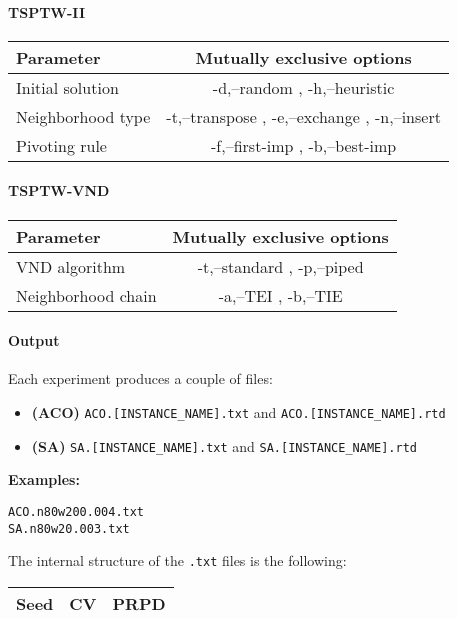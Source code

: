 \documentclass{article}
\begin{document}
\paragraph{TSPTW-II}
\begin{tabular}{|l|c|}
\hline
\textbf{Parameter}	&	\textbf{Mutually exclusive options} \\ \hline
Initial solution & -d,--random , -h,--heuristic \\ \hline
Neighborhood type &-t,--transpose , -e,--exchange , -n,--insert \\ \hline 
Pivoting rule &	-f,--first-imp , -b,--best-imp \\ \hline
\end{tabular}

\paragraph{TSPTW-VND}

\begin{tabular}{|l|c|}
\hline
\textbf{Parameter}	&	\textbf{Mutually exclusive options} \\ \hline
VND algorithm & -t,--standard , -p,--piped \\ \hline
Neighborhood chain & 	-a,--TEI  , -b,--TIE \\ \hline
\end{tabular}

\paragraph{Output}
Each experiment produces a couple of files:
\begin{itemize}
  \item \textbf{(ACO)} \verb|ACO.[INSTANCE_NAME].txt| and \verb|ACO.[INSTANCE_NAME].rtd|
  \item \textbf{(SA)} \verb|SA.[INSTANCE_NAME].txt| and \verb|SA.[INSTANCE_NAME].rtd|
\end{itemize} 
				
					 
\textbf{Examples:} \begin{verbatim}
ACO.n80w200.004.txt
SA.n80w20.003.txt
\end{verbatim}


The internal structure of the \verb|.txt| files is the following: 
\begin{tabular}{|c|c|c|}
\hline
\textbf{Seed}	&	\textbf{CV} & \textbf{PRPD} \\ \hline
\end{tabular}
\end{document}
